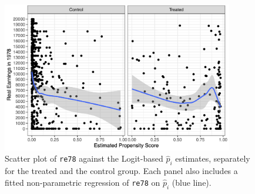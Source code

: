 \documentclass[
]{article}
\begin{document}
\begin{figure}[!htb]
\centering
  \includegraphics[width=0.9\textwidth]{figures/figures_end.png}
  \caption{Scatter plot of \texttt{re78} against the Logit-based $\widehat{p}_{i}$ estimates, separately for the treated and the control group. Each panel also includes a fitted non-parametric regression of \texttt{re78} on $\widehat{p}_{i}$ (blue line).}
  \label{fig:propensity_vs_earnings}
\end{figure}
\end{document}
